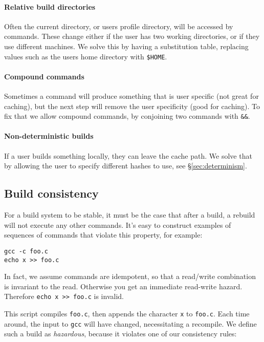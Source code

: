 \paragraph{Relative build directories} Often the current directory, or users profile directory, will be accessed by commands. These change either if the user has two working directories, or if they use different machines. We solve this by having a substitution table, replacing values such as the users home directory with \texttt{\$HOME}.

\paragraph{Compound commands} Sometimes a command will produce something that is user specific (not great for caching), but the next step will remove the user specificity (good for caching). To fix that we allow compound commands, by conjoining two commands with \texttt{\&\&}.

\paragraph{Non-deterministic builds} If a user builds something locally, they can leave the cache path. We solve that by allowing the user to specify different hashes to use, see \S\ref{sec:determinism}.

\subsection{Build consistency}

For a \Make build system to be stable, it must be the case that after a build, a rebuild will not execute any other commands. It's easy to construct examples of sequences of commands that violate this property, for example:

\begin{verbatim}
gcc -c foo.c
echo x >> foo.c
\end{verbatim}

In fact, we assume commands are idempotent, so that a read/write combination is invariant to the read. Otherwise you get an immediate read-write hazard. Therefore \texttt{echo x >> foo.c} is invalid.

This script compiles \texttt{foo.c}, then appends the character \texttt{x} to \texttt{foo.c}. Each time around, the input to \texttt{gcc} will have changed, necessitating a recompile. We define such a build as \emph{hazardous}, because it violates one of our consistency rules:

